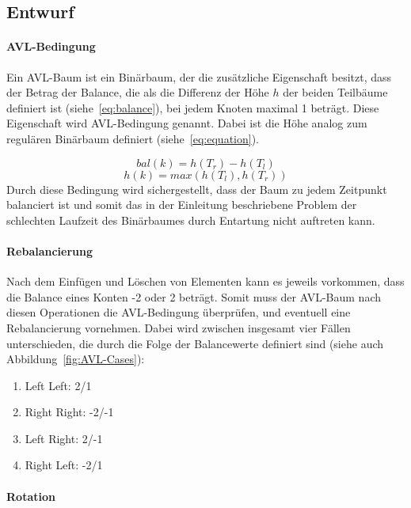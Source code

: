 \subsection{Entwurf}\label{subsec:entwurf}
\paragraph{AVL-Bedingung}
Ein AVL-Baum ist ein Binärbaum, der die zusätzliche Eigenschaft besitzt, dass
der Betrag der Balance, die als die Differenz der Höhe $h$ der beiden
Teilbäume definiert ist (siehe~\ref{eq:balance}), bei jedem Knoten maximal 1 beträgt.
Diese Eigenschaft wird AVL-Bedingung genannt.
Dabei ist die Höhe analog zum regulären Binärbaum definiert (siehe~\ref{eq:equation}).

\begin{equation}
    bal(k) = h(T_r) - h(T_l)\label{eq:balance}
\end{equation}
\begin{equation}
    h(k) = max(h(T_l), h(T_r))\label{eq:equation}
\end{equation}
Durch diese Bedingung wird sichergestellt, dass der Baum zu jedem Zeitpunkt
balanciert ist und somit das in der Einleitung beschriebene Problem der
schlechten Laufzeit des Binärbaumes durch Entartung nicht auftreten kann.

\paragraph{Rebalancierung}
Nach dem Einfügen und Löschen von Elementen kann es jeweils vorkommen, dass die
Balance eines Konten -2 oder 2 beträgt.
Somit muss der AVL-Baum nach diesen Operationen die AVL-Bedingung überprüfen,
und eventuell eine Rebalancierung vornehmen.
Dabei wird zwischen insgesamt vier Fällen unterschieden, die durch die Folge
der Balancewerte definiert sind (siehe auch Abbildung~\ref{fig:AVL-Cases}):
\begin{enumerate}
    \item Left Left: 2/1
    \item Right Right: -2/-1
    \item Left Right: 2/-1
    \item Right Left: -2/1
\end{enumerate}

\paragraph*{Rotation}

